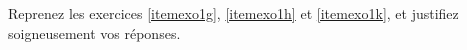
\begin{exercice}\label{exo0002}

Reprenez les exercices \ref{itemexo1g}, \ref{itemexo1h} et \ref{itemexo1k}, et justifiez soigneusement vos réponses.

\end{exercice}
